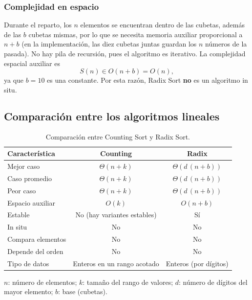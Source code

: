 \documentclass[11pt,letterpaper]{article}
\begin{document}
\subsubsection{Complejidad en espacio}

Durante el reparto, los $n$ elementos se encuentran dentro de las cubetas, además de las $b$ cubetas mismas, por lo que se necesita memoria auxiliar proporcional a $n + b$ (en la implementación, las diez cubetas juntas guardan los $n$ números de la pasada). No hay pila de recursión, pues el algoritmo es iterativo. La complejidad espacial auxiliar es
\[
  S(n) \in O(n + b) = O(n),
\]
ya que $b = 10$ es una constante. Por esta razón, Radix Sort \textbf{no} es un algoritmo in situ.

\subsection{Comparación entre los algoritmos lineales}

\begin{table}[htbp]
  \centering
  \caption{Comparación entre Counting Sort y Radix Sort.}
  \begin{tabular}{lcc}
    \toprule
    \textbf{Característica} & \textbf{Counting} & \textbf{Radix} \\
    \midrule
    Mejor caso          & $\Theta(n + k)$       & $\Theta(d\,(n + b))$ \\
    Caso promedio       & $\Theta(n + k)$       & $\Theta(d\,(n + b))$ \\
    Peor caso           & $\Theta(n + k)$       & $\Theta(d\,(n + b))$ \\
    Espacio auxiliar    & $O(k)$                & $O(n + b)$ \\
    Estable             & No (hay variantes estables) & Sí \\
    In situ             & No                    & No \\
    Compara elementos   & No                    & No \\
    Depende del orden   & No                    & No \\
    Tipo de datos       & Enteros en un rango acotado & Enteros (por dígitos) \\
    \bottomrule
  \end{tabular}

  \smallskip
  {\footnotesize $n$: número de elementos; $k$: tamaño del rango de valores; $d$: número de dígitos del mayor elemento; $b$: base (cubetas).}
\end{table}
\end{document}
